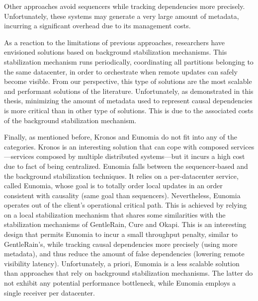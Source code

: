 Other approaches avoid sequencers while tracking dependencies more precisely. 
Unfortunately, these systems may generate a very large amount of metadata, 
incurring a significant overhead due to its management costs.

As a reaction to the limitations of previous approaches, 
researchers have envisioned solutions based on background stabilization mechanisms. 
This stabilization mechanism runs periodically, 
coordinating all partitions belonging to the same datacenter, 
in order to orchestrate when remote updates can safely become visible. 
From our perspective, this type of solutions are the most scalable and 
performant solutions of the literature. 
Unfortunately, as demonstrated in this thesis, 
minimizing the amount of metadata used to represent causal dependencies 
is more critical than in other type of solutions. 
This is due to the associated costs of the background stabilization mechanism.

Finally, as mentioned before, Kronos and Eunomia do not fit into any of the categories. 
Kronos is an interesting solution that can cope with composed services—services 
composed by multiple distributed systems—but it incurs a high cost due to fact of being centralized. 
Eunomia falls between the sequencer-based and the background stabilization techniques. 
It relies on a per-datacenter service, 
called Eunomia, 
whose goal is to totally order local updates in an order consistent with causality (same goal than sequencers). 
Nevertheless, Eunomia operates out of the client’s operational critical path. 
This is achieved by relying on a local stabilization mechanism that shares some 
similarities with the stabilization mechanisms of GentleRain, Cure and Okapi. 
This is an interesting design that permits Eunomia to incur a small throughput penalty, 
similar to GentleRain’s, 
while tracking causal dependencies more precisely (using more metadata), 
and thus reduce the amount of false dependencies (lowering remote visibility latency). 
Unfortunately, a priori, Eunomia is a less scalable solution than approaches that rely on background stabilization mechanisms. The latter do not exhibit any potential performance bottleneck, while Eunomia employs a single receiver per datacenter.

